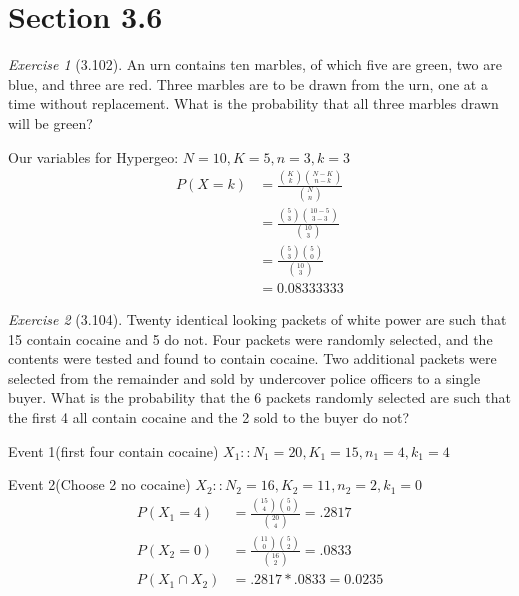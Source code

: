 \documentclass[12pt]{amsart}
\makeatletter
\theoremstyle{remark}
\newtheorem*{exercise}{Exercise}%
\renewenvironment{proof}[1][\proofname]{\par\doublespacing
  \pushQED{\qed}%
  \normalfont \topsep6\p@\@plus6\p@\relax
  \list{}{%
    \settowidth{\leftmargin}{\itshape\proofname:\hskip\labelsep}%
    \setlength{\labelwidth}{0pt}%
    \setlength{\itemindent}{-\leftmargin}%
  }%
  \item[\hskip\labelsep\itshape#1\@addpunct{:}]\ignorespaces
}{%
  \popQED\endlist\@endpefalse
  \singlespacing
}
\theoremstyle{mycomment}
\makeatother
\begin{document}
\section*{Section 3.6}
\begin{exercise}[3.102]
An urn contains ten marbles, of which five are green, two are blue, and three are red. Three
marbles are to be drawn from the urn, one at a time without replacement. What is the probability
that all three marbles drawn will be green?
\begin{proof}[Solution]
Our variables for Hypergeo: $N = 10, K = 5, n = 3, k = 3$ 
\begin{align*}
  P(X=k) &= \frac{{K \choose k}{N - K \choose n - k}}{{N \choose n}} \\
         &= \frac{{5 \choose 3}{10 - 5 \choose 3 - 3}}{{10 \choose 3}} \\
         &= \frac{{5 \choose 3}{5 \choose 0}}{{10 \choose 3}} \\
         &= 0.08333333
\end{align*}
\end{proof}
\end{exercise}
\begin{exercise}[3.104] Twenty identical looking packets of white power are such that 15 contain cocaine and 5 do
not. Four packets were randomly selected, and the contents were tested and found to contain
cocaine. Two additional packets were selected from the remainder and sold by undercover
police officers to a single buyer. What is the probability that the 6 packets randomly selected
are such that the first 4 all contain cocaine and the 2 sold to the buyer do not?

\begin{proof}[Solution]
Event 1(first four contain cocaine) $X_1::N_1 = 20, K_1 = 15, n_1 = 4, k_1 = 4$ 

Event 2(Choose 2 no cocaine) $X_2::N_2 = 16, K_2 = 11, n_2 = 2, k_1 = 0$
\begin{align*}
  P(X_1 = 4) &= \frac{{15 \choose 4}{5 \choose 0}}{{20 \choose 4}} = .2817 \\
  P(X_2 = 0) &= \frac{{11 \choose 0}{5 \choose 2}}{{16 \choose 2}} = .0833 \\
  P(X_1 \cap X_2) &= .2817*.0833 = 0.0235
\end{align*}
\end{proof}
\end{exercise}
\end{document}
